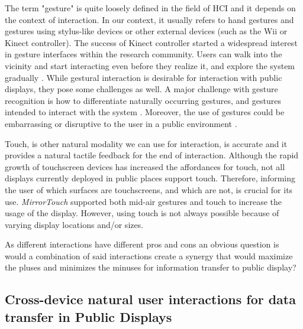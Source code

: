 The term "gesture" is quite loosely defined in the field of HCI and it depends on the context of interaction. In our context, it usually refers to hand gestures and gestures using stylus-like devices or other external devices (such as the Wii or Kinect controller). The success of Kinect controller started a widespread interest in gesture interfaces within the research community. Users can walk into the vicinity and start interacting even before they
realize it, and explore the system gradually \cite{Muller:2012}. While gestural interaction is desirable for interaction with public displays, they pose some
challenges as well. A major challenge with gesture recognition is how to differentiate naturally occurring  gestures, and gestures intended to interact with the system \cite{Wexelblat:1997}. Moreover, the use of gestures could be embarrassing or disruptive to the user in a public environment \cite{Rico:2010}. 

Touch, is other natural modality we can use for interaction, is accurate and it provides a natural tactile feedback for the end of interaction. Although the rapid growth of touchscreen devices has increased the affordances for touch, not all displays currently deployed in public places support touch. Therefore, informing the user of which surfaces are touchscreens, and which are not, is crucial for its use. \emph{MirrorTouch} supported both mid-air gestures and touch to increase the usage of the display\cite{Muller:2014}. However, using touch is not always possible because of varying display locations and/or sizes.

As different interactions have different pros and cons an obvious question is would a combination of said interactions create a synergy that would maximize the pluses and minimizes the minuses for information transfer to public display?

 \subsection{Cross-device natural user interactions for data transfer in Public Displays}
 